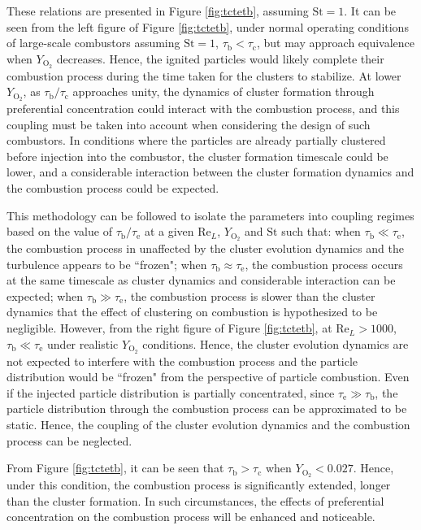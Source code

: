 \documentclass[authoryear,preprint,review,12pt]{elsarticle}
\newcommand{\mrm}[1]{\mathrm{#1}}
\newcommand{\taub}{\tau_\mathrm{b}}
\newcommand{\tauc}{\tau_\mathrm{c}}
\newcommand{\taue}{\tau_\mathrm{e}}
\begin{document}
These relations are presented in Figure \ref{fig:tctetb}, assuming $\mrm{St}=1$. It can be seen from the left figure of Figure \ref{fig:tctetb}, under normal operating conditions of large-scale combustors assuming $\mrm{St}=1$, $\taub<\tauc$, but may approach equivalence when $Y_\mrm{O_2}$ decreases. Hence, the ignited particles would likely complete their combustion process during the time taken for the clusters to stabilize. At lower $Y_\mrm{O_2}$, as $\taub/\tauc$ approaches unity, the dynamics of cluster formation through preferential concentration could interact with the combustion process, and this coupling must be taken into account when considering the design of such combustors. In conditions where the particles are already partially clustered before injection into the combustor, the cluster formation timescale could be lower, and a considerable interaction between the cluster formation dynamics and the combustion process could be expected. \fi

 \iffalse This methodology can be followed to isolate the parameters into coupling regimes based on the value of $\taub/\taue$ at a given $\mrm{Re}_L$, $Y_\mrm{O_2}$ and $\mrm{St}$ such that: when $\taub \ll \taue$, the combustion process in unaffected by the cluster evolution dynamics and the turbulence appears to be ``frozen"; when $\taub \approx \taue$, the combustion process occurs at the same timescale as cluster dynamics and considerable interaction can be expected; when $\taub \gg \taue$, the combustion process is slower than the cluster dynamics that the effect of clustering on combustion is hypothesized to be negligible.
However, from the right figure of Figure \ref{fig:tctetb}, at $\mrm{Re}_L > 1000$, $\taub \ll \taue$ under realistic $Y_\mrm{O_2}$ conditions. Hence, the cluster evolution dynamics are not expected to interfere with the combustion process and the particle distribution would be ``frozen" from the perspective of particle combustion. Even if the injected particle distribution is partially concentrated, since $\taue \gg \taub$, the particle distribution through the combustion process can be approximated to be static. Hence, the coupling of the cluster evolution dynamics and the combustion process can be neglected.


From Figure \ref{fig:tctetb}, it can be seen that $\taub > \tauc$ when $Y_\mrm{O_2}<0.027$. Hence, under this condition, the combustion process is significantly extended, longer than the cluster formation. In such circumstances, the effects of preferential concentration on the combustion process will be enhanced and noticeable. 
\end{document}
